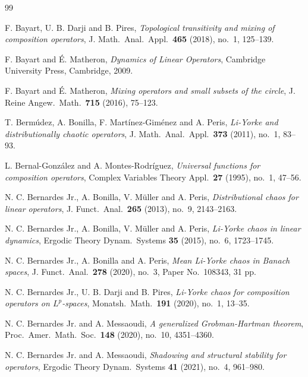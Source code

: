 \documentclass[12pt]{amsart}
\theoremstyle{theorem}
\theoremstyle{definition}
\theoremstyle{remark} \theoremstyle{question} \theoremstyle{example}
\begin{document}

\begin{thebibliography}{99}

 F. Bayart, U. B. Darji and B. Pires,
    {\it Topological transitivity and mixing of composition operators}, J. Math.\ Anal.\ Appl.\ {\bf 465} (2018), no.\ 1, 125--139.
    
 F. Bayart and \'E. Matheron, 
    {\it Dynamics of Linear Operators}, Cambridge University Press, Cambridge, 2009.

 F. Bayart and \'E. Matheron, 
    {\it Mixing operators and small subsets of the circle}, J. Reine Angew.\ Math.\ {\bf 715} (2016), 75--123.

 T. Berm\'udez, A. Bonilla, F. Mart\'inez-Gim\'enez and A. Peris,
    {\it Li-Yorke and distributionally chaotic operators}, J. Math.\ Anal.\ Appl.\ {\bf 373} (2011), no.\ 1, 83--93.

 L. Bernal-Gonz\'alez and A. Montes-Rodr\'iguez,
    {\it Universal functions for composition operators}, Complex Variables Theory Appl.\ {\bf 27} (1995), no.\ 1, 47--56.

 N. C. Bernardes Jr., A. Bonilla, V. M\"uller and A. Peris,
    {\it Distributional chaos for linear operators}, J. Funct.\ Anal.\ {\bf 265} (2013), no.\ 9, 2143--2163.

 N. C. Bernardes Jr., A. Bonilla, V. M\"uller and A. Peris,
    {\it Li-Yorke chaos in linear dynamics}, Ergodic Theory Dynam.\ Systems {\bf 35} (2015), no.\ 6, 1723--1745.

 N. C. Bernardes Jr., A. Bonilla and A. Peris,
     {\it Mean Li-Yorke chaos in Banach spaces}, J. Funct.\ Anal.\ {\bf 278} (2020), no.\ 3, Paper No.\ 108343, 31 pp.

 N. C. Bernardes Jr., U. B. Darji and B. Pires,
    {\it Li-Yorke chaos for composition operators on $L^p$-spaces}, Monatsh.\ Math.\ {\bf 191} (2020), no.\ 1, 13--35.

 N. C. Bernardes Jr. and A. Messaoudi,
    {\it A generalized Grobman-Hartman theorem}, Proc.\ Amer.\ Math.\ Soc.\ {\bf 148} (2020), no.\ 10, 4351--4360.

 N. C. Bernardes Jr. and A. Messaoudi,
    {\it Shadowing and structural stability for operators}, Ergodic Theory Dynam.\ Systems {\bf 41} (2021), no.\ 4, 961--980.


\end{thebibliography}
\end{document}
